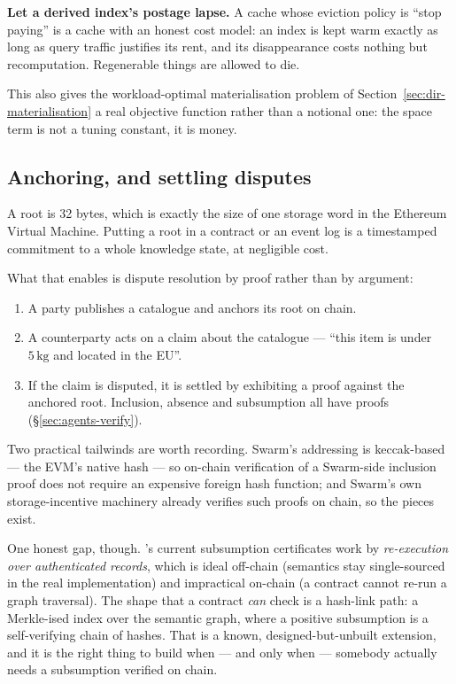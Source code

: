 \begin{keyidea}
\textbf{Let a derived index's postage lapse.} A cache whose eviction policy is
``stop paying'' is a cache with an honest cost model: an index is kept warm
exactly as long as query traffic justifies its rent, and its disappearance
costs nothing but recomputation. Regenerable things are allowed to die.
\end{keyidea}

This also gives the workload-optimal materialisation problem of
Section~\ref{sec:dir-materialisation} a real objective function rather than a
notional one: the space term is not a tuning constant, it is money.

\subsection{Anchoring, and settling disputes}

A root is 32 bytes, which is exactly the size of one storage word in the
Ethereum Virtual Machine. Putting a root in a contract or an event log is a
timestamped commitment to a whole knowledge state, at negligible cost.

What that enables is dispute resolution by proof rather than by argument:

\begin{enumerate}[leftmargin=1.7em]
\item A party publishes a catalogue and anchors its root on chain.
\item A counterparty acts on a claim about the catalogue --- ``this item is
  under $5\,\mathrm{kg}$ and located in the EU''.
\item If the claim is disputed, it is settled by exhibiting a proof against
  the anchored root. Inclusion, absence and subsumption all have proofs
  (\S\ref{sec:agents-verify}).
\end{enumerate}

Two practical tailwinds are worth recording. Swarm's addressing is
keccak-based --- the EVM's native hash --- so on-chain verification of a
Swarm-side inclusion proof does not require an expensive foreign hash
function; and Swarm's own storage-incentive machinery already verifies such
proofs on chain, so the pieces exist.

One honest gap, though. \odag{}'s current subsumption certificates work by
\emph{re-execution over authenticated records}, which is ideal off-chain
(semantics stay single-sourced in the real implementation) and impractical
on-chain (a contract cannot re-run a graph traversal). The shape that a
contract \emph{can} check is a hash-link path: a Merkle-ised index over the
semantic graph, where a positive subsumption is a self-verifying chain of
hashes. That is a known, designed-but-unbuilt extension, and it is the right
thing to build when --- and only when --- somebody actually needs a
subsumption verified on chain.


